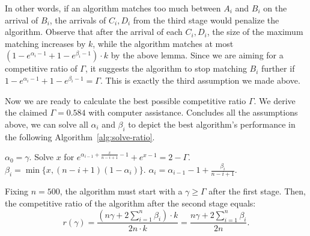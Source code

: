 In other words, if an algorithm matches too much between $A_i$ and $B_i$ on the arrival of $B_i$, the arrivals of $C_i, D_i$ from the third stage would penalize the algorithm. Observe that after the arrival of each $C_i,D_i$, the size of the maximum matching increases by $k$, while the algorithm matches at most $(1-e^{\alpha_i-1} + 1-e^{\beta_i-1}) \cdot k$ by the above lemma. Since we are aiming for a competitive ratio of $\Gamma$, it suggests the algorithm to stop matching $B_i$ further if $1-e^{\alpha_i-1} + 1 - e^{\beta_i-1} = \Gamma$. This is exactly the third assumption we made above.  

Now we are ready to calculate the best possible competitive ratio $\Gamma$. We derive the claimed $\Gamma=0.584$ with computer assistance. Concludes all the assumptions above, we can solve all $\alpha_i$ and $\beta_i$ to depict the best algorithm's performance in the following Algorithm~\ref{alg:solve-ratio}.
\begin{algorithm}[H]
	\caption{Solve $\alpha$ an $\beta$}
	\label{alg:solve-ratio}
	\begin{algorithmic}
	    \State $\alpha_0=\gamma$.
	       \State Solve $x$ for $e^{\alpha_{i-1} + \frac{x}{n-i+1} - 1} + e^{x-1} = 2-\Gamma$.
	       \State $\beta_i=\min\{x,(n-i+1)(1-\alpha_i)\}$.
	       \State $\alpha_i=\alpha_{i-1}-1+\frac{\beta_i}{n-i+1}$.
	    \EndFor
	\end{algorithmic}
\end{algorithm}

Fixing $n=500$, the algorithm must start with a $\gamma \ge \Gamma$ after the first stage. Then, the competitive ratio of the algorithm after the second stage equals:
\[
r(\gamma) = \frac{\left( n\gamma+2\sum_{i=1}^{n} \beta_i \right) \cdot k}{2n \cdot k} = \frac{n\gamma + 2\sum_{i=1}^{n} \beta_i}{2n}.
\]




